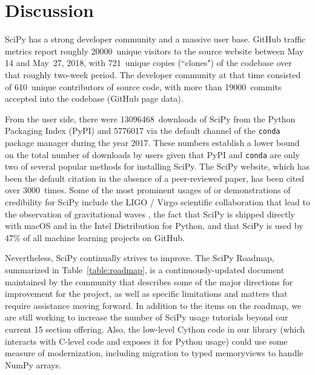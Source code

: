 \documentclass[fleqn,10pt]{wlscirep}
\begin{document}
\section*{Discussion}


SciPy has a strong developer community and a massive user base. GitHub traffic
metrics report roughly \num{20000}~unique visitors to the source website between May
14 and May~27, 2018, with 721~unique copies (``clones") of the codebase over
that roughly two-week period. The developer community at that time consisted of 610~unique
contributors of source code, with more than \num{19000}~commits accepted into the codebase
(GitHub page data).

From the user side, there were \num{13096468}~downloads of SciPy from the Python
Packaging Index (PyPI)\cite{pypinfo} and \num{5776017} via the default channel of the
\texttt{conda}\cite{condainfo} package manager during the year 2017. These numbers establish a lower
bound on the total number of downloads by users given that
PyPI and \texttt{conda} are only two of several popular methods for installing SciPy.  The SciPy
website\cite{SciPylib}, which has been the default citation in the absence of a
peer-reviewed paper, has been cited over \num{3000}~times\cite{googlescholar}. Some of the most prominent
usages of or demonstrations of credibility for SciPy include the LIGO / Virgo
scientific collaboration that lead to the observation of gravitational waves
\cite{PhysRevLett.116.061102}, the fact that SciPy is shipped directly with
macOS and in the Intel Distribution for Python\cite{intel-python}, and that SciPy is used
by 47\% of all machine learning projects on GitHub\cite{octoverse-scipy}.

Nevertheless, SciPy continually strives to improve.
The SciPy Roadmap\cite{SciPy_roadmap_1,SciPy_roadmap_dev}, summarized in Table~\ref{table:roadmap}, is a
continuously-updated document
maintained by the community that describes some of the major directions for
improvement for the project, as well as specific limitations and matters that
require assistance moving forward.
In addition to the items on the roadmap,
we are still working to increase the number of SciPy usage tutorials beyond
our current 15 section offering\cite{SciPy_tutorials}.
Also, the low-level Cython code in our library (which interacts with C-level code and
exposes it for Python usage) could use some measure of modernization, including
migration to typed memoryviews to handle NumPy arrays.
\end{document}
